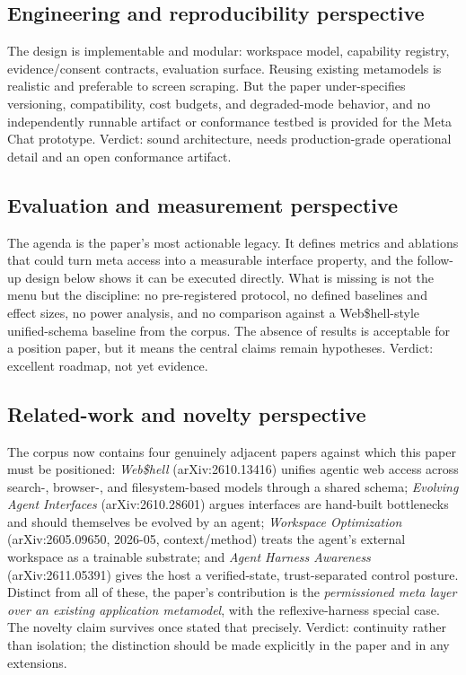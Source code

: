 \documentclass[11pt,a4paper]{article}
\begin{document}
\subsection{Engineering and reproducibility perspective}
The design is implementable and modular: workspace model, capability registry, evidence/consent contracts, evaluation surface. Reusing existing metamodels is realistic and preferable to screen scraping. But the paper under-specifies versioning, compatibility, cost budgets, and degraded-mode behavior, and no independently runnable artifact or conformance testbed is provided for the Meta Chat prototype. Verdict: sound architecture, needs production-grade operational detail and an open conformance artifact.

\subsection{Evaluation and measurement perspective}
The agenda is the paper's most actionable legacy. It defines metrics and ablations that could turn meta access into a measurable interface property, and the follow-up design below shows it can be executed directly. What is missing is not the menu but the discipline: no pre-registered protocol, no defined baselines and effect sizes, no power analysis, and no comparison against a Web\$hell-style unified-schema baseline from the corpus. The absence of results is acceptable for a position paper, but it means the central claims remain hypotheses. Verdict: excellent roadmap, not yet evidence.

\subsection{Related-work and novelty perspective}
The corpus now contains four genuinely adjacent papers against which this paper must be positioned: \emph{Web\$hell} (arXiv:2610.13416) unifies agentic web access across search-, browser-, and filesystem-based models through a shared schema; \emph{Evolving Agent Interfaces} (arXiv:2610.28601) argues interfaces are hand-built bottlenecks and should themselves be evolved by an agent; \emph{Workspace Optimization} (arXiv:2605.09650, 2026-05, context/method) treats the agent's external workspace as a trainable substrate; and \emph{Agent Harness Awareness} (arXiv:2611.05391) gives the host a verified-state, trust-separated control posture. Distinct from all of these, the paper's contribution is the \emph{permissioned meta layer over an existing application metamodel}, with the reflexive-harness special case. The novelty claim survives once stated that precisely. Verdict: continuity rather than isolation; the distinction should be made explicitly in the paper and in any extensions.
\end{document}

